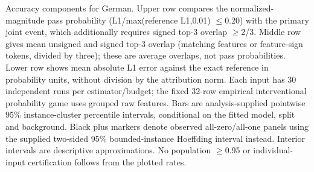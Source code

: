 Accuracy components for German. Upper row compares the normalized-magnitude pass probability (L1/max(reference L1,0.01) $\leq$0.20) with the primary joint event, which additionally requires signed top-3 overlap $\geq$2/3. Middle row gives mean unsigned and signed top-3 overlap (matching features or feature-sign tokens, divided by three); these are average overlaps, not pass probabilities. Lower row shows mean absolute L1 error against the exact reference in probability units, without division by the attribution norm. Each input has 30 independent runs per estimator/budget; the fixed 32-row empirical interventional probability game uses grouped raw features. Bars are analysis-supplied pointwise 95\% instance-cluster percentile intervals, conditional on the fitted model, split and background. Black plus markers denote observed all-zero/all-one panels using the supplied two-sided 95\% bounded-instance Hoeffding interval instead. Interior intervals are descriptive approximations. No population $\geq$0.95 or individual-input certification follows from the plotted rates.

